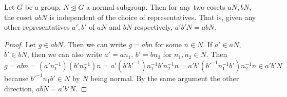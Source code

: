 \documentclass{amsart}
\begin{document}
\begin{proposition}\label{well-defined}
   Let \(G\) be a group, \(N\trianglelefteq G\) a normal subgroup. Then for any
	two cosets \(aN, bN\), the coset \(abN\) is independent of the choice of
	representatives. That is, given any other representatives \(a', b'\) of
	\(aN\) and \(bN\) respectively, \(a'b'N = abN\).
\end{proposition}
\begin{proof}
   Let \(g\in abN\). Then we can write \(g = abn\) for some \(n\in N\). If
	\(a'\in aN\), \(b'\in bN\), then we can also write \(a' = an_1\), \(b' =
	bn_2\) for \(n_1, n_2\in N\). Then 
	\[
		g = abn = (a'n_1^{-1})(b'n_2^{-1})n = a'(b'b'^{-1})n_1^{-1}b'n_2^{-1}n =
		a'b'(b'^{-1}n_1^{-1}b')n_2^{-1}n \in a'b'N
	\]
	because \(b'^{-1}n_1b'\in N\) by \(N\) being normal. By the same
	argument the other direction, \(abN = a'b'N\).
\end{proof}
\end{document}
